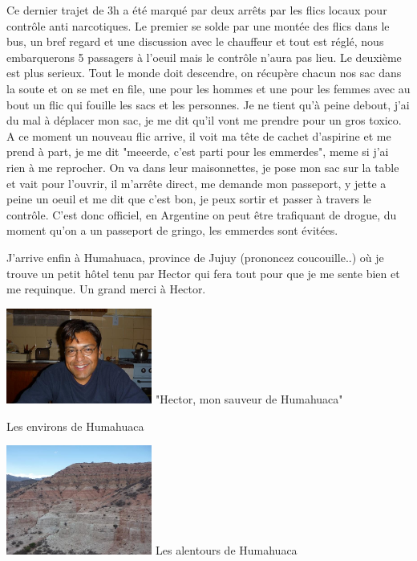 \begin{multicols}{2}
Ce dernier trajet de 3h a été marqué par deux arrêts par les flics locaux pour contrôle anti narcotiques. Le premier se solde par une montée des flics dans le bus, un bref regard et une discussion avec le chauffeur et tout est réglé, nous embarquerons 5 passagers à l'oeuil mais le contrôle n'aura pas lieu. Le deuxième est plus serieux. Tout le monde doit descendre, on récupère chacun nos sac dans la soute et on se met en file, une pour les hommes et une pour les femmes avec au bout un flic qui fouille les sacs et les personnes. Je ne tient qu'à peine debout, j'ai du mal à déplacer mon sac, je me dit qu'il vont me prendre pour un gros toxico. A ce moment un nouveau flic arrive, il voit ma tête de cachet d'aspirine et me prend à part, je me dit "meeerde, c'est parti pour les emmerdes", meme si j'ai rien à me reprocher. On va dans leur maisonnettes, je pose mon sac sur la table et vait pour l'ouvrir, il m'arrête direct, me demande mon passeport, y jette a peine un oeuil et me dit que c'est bon, je peux sortir et passer à travers le contrôle. C'est donc officiel, en Argentine on peut être trafiquant de drogue, du moment qu'on a un passeport de gringo, les emmerdes sont évitées.

J'arrive enfin à Humahuaca, province de Jujuy (prononcez coucouille..) où je trouve un petit hôtel tenu par Hector qui fera tout pour que je me sente bien et me requinque. Un grand merci à Hector.

\hspace*{-0.65cm}
\includegraphics[width=4.8cm]{articles/La-paz-humahuaca-et-salaar/1257388208hISG.jpg}
"Hector, mon sauveur de Humahuaca"

Les environs de Humahuaca

\hspace*{-0.65cm}
\includegraphics[width=4.8cm]{articles/La-paz-humahuaca-et-salaar/125738819811hb.jpg}
Les alentours de Humahuaca


\end{multicols}
